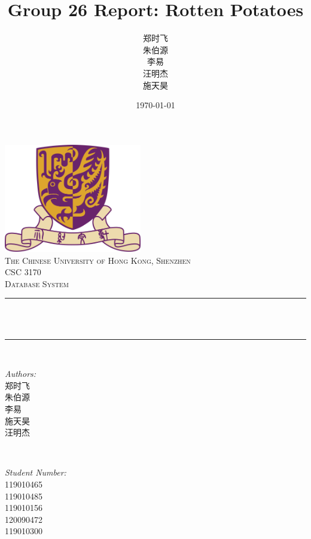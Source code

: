 \title{Group 26 Report: Rotten Potatoes} %
\author{郑时飞 \\ 朱伯源 \\ 李易 \\ 汪明杰 \\ 施天昊}%
\date{\today}%



\usepackage{graphicx}
\graphicspath{{graphics/}}
\usepackage{geometry}
\geometry{left=5cm,top=5cm,right=0cm,bottom=0cm}

\usepackage[colorlinks,linkcolor=blue]{hyperref}


\begin{CJK*}{UTF8}{gbsn}

\begin{titlepage}
    \centering
    \vspace*{0.5 cm}
    \includegraphics[scale = 0.75,width=6cm]{CUHK}\\[1.0 cm]
    \textsc{\large The Chinese University of Hong Kong, Shenzhen}\\[1.5 cm] 
    \textsc{\Large CSC 3170}\\[0.5 cm] 
    \textsc{\large Database System}\\[0.5 cm]
    \rule{\linewidth}{0.2 mm} \\[0.4 cm]
    { \huge \bfseries \thetitle}\\
    \rule{\linewidth}{0.2 mm} \\[0.6 cm]
    
    \begin{minipage}{0.4\textwidth}
        \begin{flushleft} \large
            \emph{Authors:}\\
            郑时飞 \\ 朱伯源 \\ 李易 \\ 施天昊 \\ 汪明杰
            \end{flushleft}
    \end{minipage}~
    \begin{minipage}{0.4\textwidth}
            \begin{flushright} \large
            \emph{Student Number:} \\
            119010465 \\ 119010485 \\ 119010156 \\ 120090472 \\ 119010300
        \end{flushright}
    \end{minipage}\\[2 cm]
    {\large \thedate}\\[2 cm]
 

\end{titlepage}
\end{CJK*}
